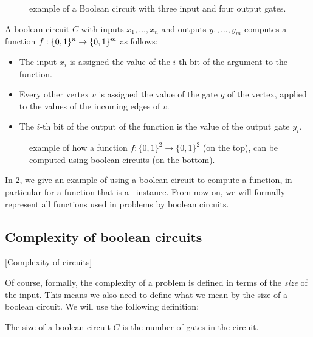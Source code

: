 \begin{figure}
	\centering
	\caption[Example of a Boolean Circuit]{example of a Boolean circuit with three input and four output gates.}\label{fig:boolean_circuit_example}
\end{figure}

\begin{definition}
	A boolean circuit $C$ with inputs $x_1, \dots, x_n$ and outputs $y_1, \dots, y_m$ computes a function $f : \{0, 1\}^n \rightarrow \{0, 1\}^m$ as follows:
	\begin{itemize}
		\item The input $x_i$ is assigned the value of the $i$-th bit of the argument to the function.
		\item Every other vertex $v$ is assigned the value of the gate $g$ of the vertex, applied to the values of the incoming edges of $v$.
		\item The $i$-th bit of the output of the function is the value of the output gate $y_i$.
	\end{itemize}
\end{definition}

\begin{figure}
	\centering
	\caption[Computing a function with circuits]{example of how a function $f : {\{0, 1\}}^2 \rightarrow {\{0, 1\}}^2$ (on the top), can be computed using boolean circuits (on the bottom).}\label{fig:computing_function_example}
\end{figure}

In \cref{fig:computing_function_example}, we give an example of using a boolean circuit to compute a function, in particular for a function that is a \Tarski\ instance. From now on, we will formally represent all functions used in problems by boolean circuits.

\subsection{Complexity of boolean circuits}[Complexity of circuits]

Of course, formally, the complexity of a problem is defined in terms of the \emph{size} of the input. This means we also need to define what we mean by the size of a boolean circuit. We will use the following definition:

\begin{definition}
	The size of a boolean circuit $C$ is the number of gates in the circuit.
\end{definition}

